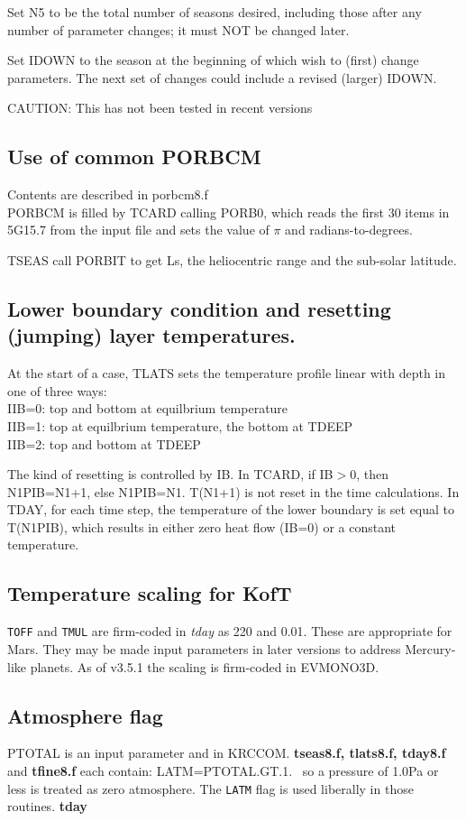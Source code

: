 \documentclass{article}
\newcommand{\qi}{\\ \hspace*{2.em}}      %
\newcommand{\np}{\textbf}  %
\newcommand{\nf}{\textit}  %
\newcommand{\nv}{\texttt}  %
\begin{document}
Set N5 to be the total number of seasons desired, including those
after any number of parameter changes; it must NOT be changed later.

Set IDOWN to the season at the beginning of which wish to (first) change
parameters. The next set of changes could include a revised (larger) IDOWN.

CAUTION: This has not been tested in recent versions 


\subsection{Use of common PORBCM}%
Contents are described in porbcm8.f \\
PORBCM is filled by TCARD calling PORB0, which reads the first 30 items in 
5G15.7 from the input file and sets the value of $\pi$ and radians-to-degrees. 

TSEAS call PORBIT to get Ls, the heliocentric range and the sub-solar latitude.

\subsection{Lower boundary condition and resetting (jumping) layer temperatures.} %
At the start of a case, TLATS sets the temperature profile linear with depth
in one of three ways:
\qi IIB=0: top and bottom at equilbrium temperature
\qi IIB=1: top at equilbrium temperature, the bottom at TDEEP
\qi IIB=2: top and bottom at TDEEP

The kind of resetting is controlled by IB. In TCARD, if IB$>$0, then N1PIB=N1+1,
else N1PIB=N1.  T(N1+1) is not reset in the time calculations. In TDAY, for each
time step, the temperature of the lower boundary is set equal to T(N1PIB), which
results in either zero heat flow (IB=0) or a constant temperature.

\subsection{Temperature scaling for KofT} 
\nv{TOFF} and \nv{TMUL} are firm-coded in \nf{tday} as 220 and 0.01. These are
appropriate for Mars.  They may be made input parameters in later versions to
address Mercury-like planets. As of v3.5.1 the scaling is firm-coded in
EVMONO3D.

\subsection{Atmosphere flag} PTOTAL is an input parameter and in KRCCOM. 
\np{tseas8.f, tlats8.f, tday8.f} and \np{tfine8.f} each contain:
LATM=PTOTAL.GT.1. \ so a pressure of 1.0Pa or less is treated as zero
atmosphere. The \nv{LATM} flag is used liberally in those routines.  \np{tday}
\end{document}
